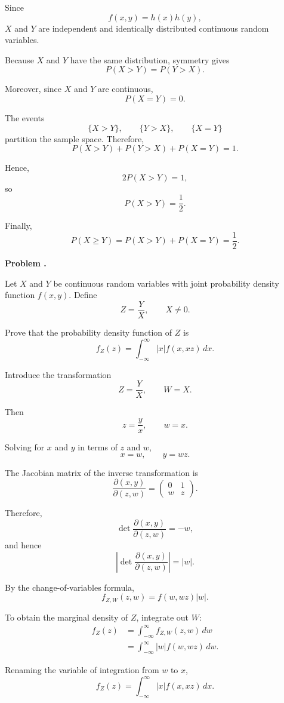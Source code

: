 \documentclass[11pt]{article}
\newcounter{problem}
\newenvironment{problem}[1][]{
    \refstepcounter{problem}
    \begin{problemheader}
        \textbf{Problem \theproblem%
        \if\relax\detokenize{#1}\relax
        \else. #1%
        \fi}
    \end{problemheader}
}{
    \vspace{0.5em}
}
\newenvironment{solution}{
    \par
    \begin{tcolorbox}[
        colback=white,
        colframe=uwgold,
        boxrule=0.7pt,
        arc=2mm,
        left=3mm,
        right=3mm,
        top=2mm,
        bottom=2mm,
        breakable,
        before skip=0.5em,
        after skip=1em,
        title=\textbf{Solution},
        coltitle=uwpurple,
        fonttitle=\bfseries
    ]
}{
    \end{tcolorbox}
}
\begin{document}
\begin{solution}

Since
\[
f(x,y)=h(x)h(y),
\]
\(X\) and \(Y\) are independent and identically distributed continuous random
variables.

Because \(X\) and \(Y\) have the same distribution, symmetry gives
\[
P(X>Y)=P(Y>X).
\]

Moreover, since \(X\) and \(Y\) are continuous,
\[
P(X=Y)=0.
\]

The events
\[
\{X>Y\},
\qquad
\{Y>X\},
\qquad
\{X=Y\}
\]
partition the sample space. Therefore,
\[
P(X>Y)+P(Y>X)+P(X=Y)=1.
\]

Hence,
\[
2P(X>Y)=1,
\]
so
\[
P(X>Y)=\frac12.
\]

Finally,
\[
P(X\geq Y)
=
P(X>Y)+P(X=Y)
=
\frac12.
\]

\end{solution}



\newpage
\begin{problem}

Let \(X\) and \(Y\) be continuous random variables with joint probability
density function \(f(x,y)\). Define
\[
Z=\frac{Y}{X},
\qquad X\neq0.
\]

Prove that the probability density function of \(Z\) is
\[
f_Z(z)
=
\int_{-\infty}^{\infty}
|x|f(x,xz)\,dx.
\]

\end{problem}

\begin{solution}

Introduce the transformation
\[
Z=\frac{Y}{X},
\qquad
W=X.
\]

Then
\[
z=\frac{y}{x},
\qquad
w=x.
\]

Solving for \(x\) and \(y\) in terms of \(z\) and \(w\),
\[
x=w,
\qquad
y=wz.
\]

The Jacobian matrix of the inverse transformation is
\[
\frac{\partial(x,y)}{\partial(z,w)}
=
\begin{pmatrix}
0 & 1\\
w & z
\end{pmatrix}.
\]

Therefore,
\[
\det
\frac{\partial(x,y)}{\partial(z,w)}
=
-w,
\]
and hence
\[
\left|
\det
\frac{\partial(x,y)}{\partial(z,w)}
\right|
=
|w|.
\]

By the change-of-variables formula,
\[
f_{Z,W}(z,w)
=
f(w,wz)|w|.
\]

To obtain the marginal density of \(Z\), integrate out \(W\):
\[
\begin{aligned}
f_Z(z)
&=
\int_{-\infty}^{\infty}
f_{Z,W}(z,w)\,dw\\
&=
\int_{-\infty}^{\infty}
|w|f(w,wz)\,dw.
\end{aligned}
\]

Renaming the variable of integration from \(w\) to \(x\),
\[
f_Z(z)
=
\int_{-\infty}^{\infty}
|x|f(x,xz)\,dx.
\]

\end{solution}
\end{document}
